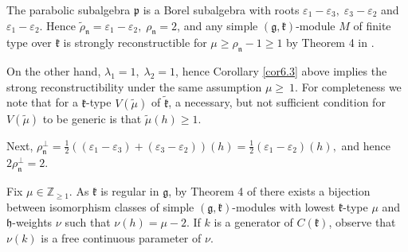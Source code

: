 \documentclass[11pt]{amsart}
\newcommand{\kk}{\mathfrak{k}}
\newcommand{\nn}{\mathfrak{n}}
\newcommand{\hh}{\mathfrak{h}}
\newcommand{\pp}{\mathfrak{p}}
\renewcommand{\gg}{\mathfrak{g}}
\newcommand{\refcor}[1]{Corollary \ref{#1}}
\newcommand{\field}[1]{\mathbb{#1}}
\begin{document}
The parabolic subalgebra $\pp$ is a Borel subalgebra with roots $\varepsilon_1-\varepsilon_3,\; \varepsilon_3-\varepsilon_2$ and $\varepsilon_1-\varepsilon_2$. Hence $\tilde{\rho}_\nn=\varepsilon_1-\varepsilon_2,\; \rho_\nn=2$, and any simple $(\gg,\kk)$-module $M$ of finite type over $\kk$ is strongly reconstructible for $\mu\geq\rho_\nn -1\geq 1$ by Theorem 4 in \cite{PZ2}.

On the other hand, $\lambda_1=1,\; \lambda_2=1$, hence \refcor{cor6.3} above implies the strong reconstructibility under the same assumption $\mu\geq\ 1$. For completeness we note that for a $\kk$-type $V(\tilde{\mu})$ of $\tilde{\kk}$, a necessary, but not sufficient condition for $V(\tilde{\mu})$ to be generic is that $\tilde{\mu}(h)\geq 1$.

Next, $\rho_\nn^\perp=\frac{1}{2}((\varepsilon_1-\varepsilon_3)+(\varepsilon_3-\varepsilon_2))(h)=\frac{1}{2}(\varepsilon_1-\varepsilon_2)(h),$ and hence $2\rho_\nn^\perp=2$.

Fix $\mu\in\field{Z}_{\geq 1}$. As $\kk$ is regular in $\gg$, by Theorem 4 of \cite{PZ2} there exists a bijection between isomorphism classes of simple $(\gg,\kk)$-modules with lowest $\kk$-type $\mu$ and $\hh$-weights $\nu$ such that $\nu(h)=\mu-2$. If $k$ is a generator of $C(\kk)$, observe that $\nu(k)$ is a free continuous parameter of $\nu$.
\end{document}
